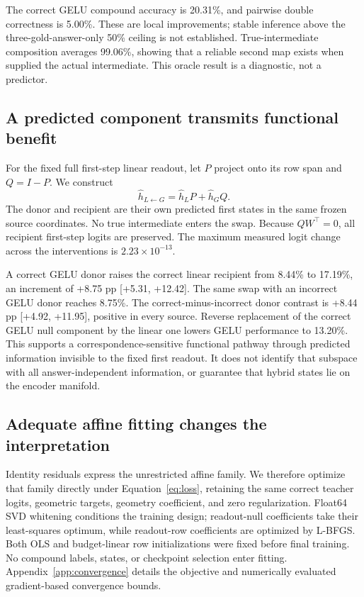The correct GELU compound accuracy is 20.31\%, and pairwise double correctness is 5.00\%.
These are local improvements; stable inference above the three-gold-answer-only 50\% ceiling is not established.
True-intermediate composition averages 99.06\%, showing that a reliable second map exists when supplied the actual intermediate.
This oracle result is a diagnostic, not a predictor.

\subsection{A predicted component transmits functional benefit}
For the fixed full first-step linear readout, let $P$ project onto its row span and $Q=I-P$.
We construct
\[
 \hat h_{L\leftarrow G}=\hat h_LP+\hat h_GQ.
\]
The donor and recipient are their own predicted first states in the same frozen source coordinates. No true intermediate enters the swap.
Because $QW^\top=0$, all recipient first-step logits are preserved.
The maximum measured logit change across the interventions is $2.23\times10^{-13}$.

A correct GELU donor raises the correct linear recipient from 8.44\% to 17.19\%, an increment of +8.75 pp [+5.31, +12.42].
The same swap with an incorrect GELU donor reaches 8.75\%.
The correct-minus-incorrect donor contrast is +8.44 pp [+4.92, +11.95], positive in every source.
Reverse replacement of the correct GELU null component by the linear one lowers GELU performance to 13.20\%.
This supports a correspondence-sensitive functional pathway through predicted information invisible to the fixed first readout.
It does not identify that subspace with all answer-independent information, or guarantee that hybrid states lie on the encoder manifold.

\subsection{Adequate affine fitting changes the interpretation}
Identity residuals express the unrestricted affine family. We therefore optimize that family directly under Equation~\ref{eq:loss}, retaining the same correct teacher logits, geometric targets, geometry coefficient, and zero regularization.
Float64 SVD whitening conditions the training design; readout-null coefficients take their least-squares optimum, while readout-row coefficients are optimized by L-BFGS.
Both OLS and budget-linear row initializations were fixed before final training.
No compound labels, states, or checkpoint selection enter fitting.
Appendix~\ref{app:convergence} details the objective and numerically evaluated gradient-based convergence bounds.

